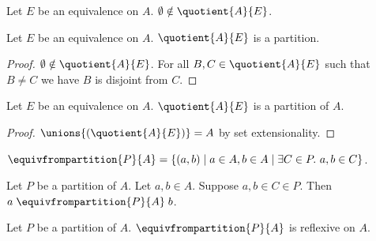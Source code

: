 \begin{corollary}\label{quotient_notni_emptyset}
    Let $E$ be an equivalence on $A$.
    $\emptyset\notin\quotient{A}{E}$.
\end{corollary}

\begin{proposition}\label{quotient_partition}
    Let $E$ be an equivalence on $A$.
    $\quotient{A}{E}$ is a partition.
\end{proposition}
\begin{proof}
    $\emptyset\notin\quotient{A}{E}$.
    For all $B, C\in \quotient{A}{E}$ such that $B\neq C$ we have $B$ is disjoint from $C$.
\end{proof}

\begin{proposition}\label{quotient_partition_of}
    Let $E$ be an equivalence on $A$.
    $\quotient{A}{E}$ is a partition of $A$.
\end{proposition}
\begin{proof}
    $\unions{(\quotient{A}{E})} = A$ by set extensionality.
\end{proof}



\begin{definition}\label{equivalence_from_partition}
    $\equivfrompartition{P}{A} = \{(a, b)\mid a\in A, b\in A\mid \exists C\in P.\ a, b\in C\}$.
\end{definition}

\begin{proposition}\label{equivalence_from_partition_intro}
    Let $P$ be a partition of $A$.
    Let $a,b\in A$.
    Suppose $a,b\in C\in P$.
    Then $a\mathrel{\equivfrompartition{P}{A}} b$.
\end{proposition}

\begin{proposition}\label{equivalence_from_partition_reflexive}
    Let $P$ be a partition of $A$.
    $\equivfrompartition{P}{A}$ is reflexive on $A$.
\end{proposition}

